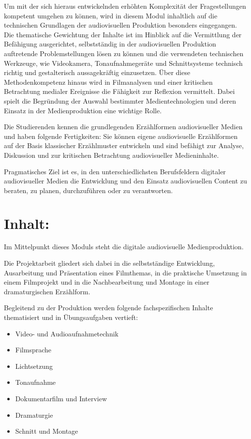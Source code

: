 Um mit der sich hieraus entwickelnden erhöhten Komplexität der
Fragestellungen kompetent umgehen zu können, wird in diesem Modul
inhaltlich auf die technischen Grundlagen der audiovisuellen Produktion
besonders eingegangen. Die thematische Gewichtung der Inhalte ist im
Hinblick auf die Vermittlung der Befähigung ausgerichtet, selbstständig
in der audiovisuellen Produktion auftretende Problemstellungen lösen zu
können und die verwendeten technischen Werkzeuge, wie Videokamera,
Tonaufnahmegeräte und Schnittsysteme technisch richtig und gestalterisch
aussagekräftig einzusetzen. Über diese Methodenkompetenz hinaus wird in
Filmanalysen und einer kritischen Betrachtung medialer Ereignisse die
Fähigkeit zur Reflexion vermittelt. Dabei spielt die Begründung der
Auswahl bestimmter Medientechnologien und deren Einsatz in der
Medienproduktion eine wichtige Rolle.

Die Studierenden kennen die grundlegenden Erzählformen audiovisueller
Medien und haben folgende Fertigkeiten: Sie können eigene audiovisuelle
Erzählformen auf der Basis klassischer Erzählmuster entwickeln und sind
befähigt zur Analyse, Diskussion und zur kritischen Betrachtung
audiovisueller Medieninhalte.

Pragmatisches Ziel ist es, in den unterschiedlichsten Berufsfeldern
digitaler audiovisueller Medien die Entwicklung und den Einsatz
audiovisuellen Content zu beraten, zu planen, durchzuführen oder zu
verantworten.

\section{Inhalt:}\label{inhalt-2}

Im Mittelpunkt dieses Moduls steht die digitale audiovisuelle
Medienproduktion.

Die Projektarbeit gliedert sich dabei in die selbstständige Entwicklung,
Ausarbeitung und Präsentation eines Filmthemas, in die praktische
Umsetzung in einem Filmprojekt und in die Nachbearbeitung und Montage in
einer dramaturgischen Erzählform.

Begleitend zu der Produktion werden folgende fachspezifischen Inhalte
thematisiert und in Übungsaufgaben vertieft:

\begin{itemize}
\tightlist
\item
  Video- und Audioaufnahmetechnik
\item
  Filmsprache
\item
  Lichtsetzung
\item
  Tonaufnahme
\item
  Dokumentarfilm und Interview
\item
  Dramaturgie
\item
  Schnitt und Montage
\end{itemize}

